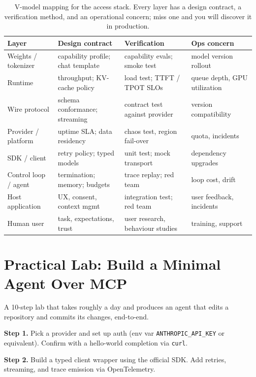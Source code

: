 \begin{table}[H]
\centering
\footnotesize
\begin{tabular}{L{2.6cm} L{4.2cm} L{4.2cm} L{3.0cm}}
\toprule
\textbf{Layer} & \textbf{Design contract} & \textbf{Verification} & \textbf{Ops concern} \\
\midrule
Weights / tokenizer & capability profile; chat template & capability evals; smoke test & model version rollout \\
Runtime & throughput; KV-cache policy & load test; TTFT / TPOT SLOs & queue depth, GPU utilization \\
Wire protocol & schema conformance; streaming & contract test against provider & version compatibility \\
Provider / platform & uptime SLA; data residency & chaos test, region fail-over & quota, incidents \\
SDK / client & retry policy; typed models & unit test; mock transport & dependency upgrades \\
Control loop / agent & termination; memory; budgets & trace replay; red team & loop cost, drift \\
Host application & UX, consent, context mgmt & integration test; red team & user feedback, incidents \\
Human user & task, expectations, trust & user research, behaviour studies & training, support \\
\bottomrule
\end{tabular}
\caption{V-model mapping for the access stack. Every layer has a
         design contract, a verification method, and an
         operational concern; miss one and you will discover it
         in production.}
\label{tab:vmodel_wk11}
\end{table}

\section{Practical Lab: Build a Minimal Agent Over MCP}

A 10-step lab that takes roughly a day and produces an agent
that edits a repository and commits its changes, end-to-end.

\textbf{Step 1.} Pick a provider and set up auth (env var
\texttt{ANTHROPIC\_API\_KEY} or equivalent). Confirm with a
hello-world completion via \texttt{curl}.

\textbf{Step 2.} Build a typed client wrapper using the official
SDK. Add retries, streaming, and trace emission via
OpenTelemetry.

